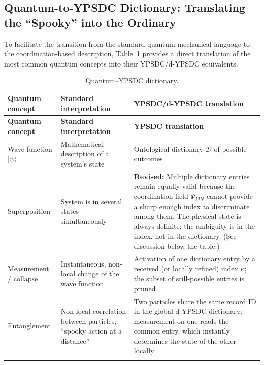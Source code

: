 \documentclass[12pt,a4paper]{article}
\theoremstyle{remark}
\begin{document}
	
	\subsection{Quantum-to-YPSDC Dictionary: Translating the ``Spooky'' into the Ordinary}
	
	To facilitate the transition from the standard quantum-mechanical
	language to the coordination-based description, Table~\ref{tab:quantum-dict}
	provides a direct translation of the most common quantum concepts
	into their YPSDC/d-YPSDC equivalents.
	
	\begin{longtable}{p{3.5cm} p{5cm} p{7cm}}
		\caption{Quantum--YPSDC dictionary.}\label{tab:quantum-dict}\\
		\toprule
		\textbf{Quantum concept} & \textbf{Standard interpretation} & \textbf{YPSDC/d-YPSDC translation} \\
		\midrule
		\endfirsthead
		
		\toprule
		\textbf{Quantum concept} & \textbf{Standard interpretation} & \textbf{YPSDC translation} \\
		\midrule
		\endhead
		
		\hline
		\endfoot
		
		\bottomrule
		\endlastfoot
		
		Wave function \(|\psi\rangle\) &
		Mathematical description of a system's state &
		Ontological dictionary \(\mathcal{D}\) of possible outcomes \\
		\addlinespace
		
		Superposition &
		System is in several states simultaneously &
		\textbf{Revised:} Multiple dictionary entries remain equally valid because the coordination field \(\Psi_{MN}\) cannot provide a sharp enough index to discriminate among them. The physical state is always definite; the ambiguity is in the index, not in the dictionary. (See discussion below the table.) \\
		\addlinespace
		
		Measurement / collapse &
		Instantaneous, non-local change of the wave function &
		Activation of one dictionary entry by a received (or locally refined) index \(\kappa\); the subset of still-possible entries is pruned \\
		\addlinespace
		
		Entanglement &
		Non-local correlation between particles; ``spooky action at a distance'' &
		Two particles share the same record ID in the global d-YPSDC dictionary; measurement on one reads the common entry, which instantly determines the state of the other locally \\
		\addlinespace
		

\end{longtable}
\end{document}
